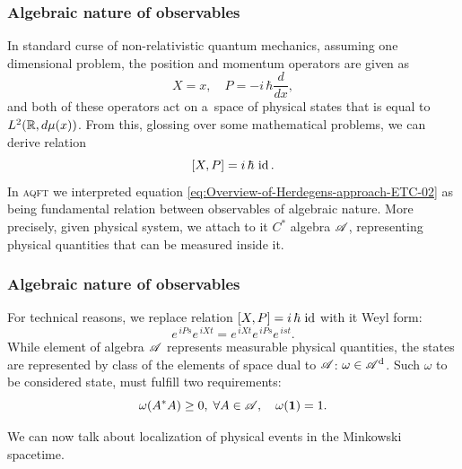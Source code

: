 \documentclass[10pt,t]{beamer}
\begin{document}
\begin{frame}
  \frametitle{Algebraic nature of observables}


  In standard curse of non-relativistic quantum mechanics, assuming
  one dimensional problem, the position and momentum operators are given as
  \begin{equation}
    \label{eq:Overview-of-Herdegens-approach-ETC-01}
    X = x, \quad
    P = -i \, \hbar \frac{ d }{ dx },
  \end{equation}
  and both of these operators act on a~space of physical states that is
  equal to $L^{ 2 }( \mathbb{R}, d\mu( x ) )$. From this, glossing over some
  mathematical problems, we can derive relation
  \begin{equation}
    \label{eq:Overview-of-Herdegens-approach-ETC-02}
    [ X, P ] = i \, \hbar \, \operatorname{id}.
  \end{equation}
  In \textsc{aqft} we interpreted equation
  \eqref{eq:Overview-of-Herdegens-approach-ETC-02} as being fundamental
  relation between observables of algebraic nature. More precisely, given
  physical system, we attach to it $C^{ * }$ algebra $\mathcal{A}$, representing
  physical quantities that can be measured inside it.

\end{frame}





\begin{frame}
  \frametitle{Algebraic nature of observables}


  For technical reasons, we replace relation $[ X, P ] = i \, \hbar \, \operatorname{id}$
  with it Weyl form:
  \begin{equation}
    \label{eq:Overview-of-Herdegens-approach-ETC-03}
    e^{ \, i P s } e^{ \, i X t } = e^{ \, i X t } e^{ \, i P s } e^{ \, i s t }.
  \end{equation}
  While element of algebra $\mathcal{A}$ represents measurable physical
  quantities, the states are represented by class of the elements of space
  dual to $\mathcal{A}$: $\omega \in \mathcal{A}^{ \text{d} }$. Such $\omega$ to be considered state,
  must fulfill two requirements:
  \begin{equation}
    \label{eq:Overview-of-Herdegens-approach-ETC-04}
    \omega( A^{ * } A ) \geq 0, \; \forall A \in \mathcal{A}, \quad
    \omega( \mathbf{1} ) = 1.
  \end{equation}

  \vspace{-2em}



  We can now talk about localization of physical events in the Minkowski
  spacetime.

\end{frame}
\end{document}
